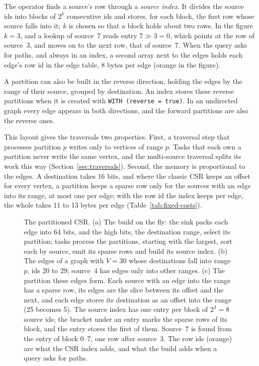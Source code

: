 The operator finds a source's row through a \emph{source index}. It divides the source ids into
blocks of $2^k$ consecutive ids and stores, for each block, the first row whose source falls into it; $k$ is chosen
so that a block holds about two rows. In the figure $k = 3$, and a lookup of source~7 reads entry $7 \gg 3 = 0$, which
points at the row of source~3, and moves on to the next row, that of source~7. When the query asks for paths, and
always in an index, a second array next to the edges holds each edge's row id in the edge table, 8 bytes per edge
(orange in the figure).

A partition can also be built in the reverse direction, holding the edges by the range of their source, grouped by
destination. An index stores these reverse partitions when it is created with \texttt{WITH (reverse = true)}. In an
undirected graph every edge appears in both directions, and the forward partitions are also the reverse ones.

This layout gives the traversals two properties. First, a traversal step that processes partition $p$ writes only to
vertices of range $p$. Tasks that each own a partition never write the same vertex, and the multi-source
traversal splits its work this way (Section~\ref{sec:traversals}). Second, the memory is proportional to the edges. A destination takes 16 bits, and where the classic CSR keeps an offset for every vertex, a partition keeps
a sparse row only for the sources with an edge into its range, at most one per edge; with the row id the index keeps per edge, the whole takes 11 to 13 bytes per edge (Table~\ref{tab:fixed-costs}).

\begin{figure}[t]
  \centering
  
  \caption{The partitioned CSR. (a) The build on the fly: the sink packs each edge into 64 bits, and the high
  bits, the destination range, select its partition; tasks process the partitions, starting with the largest, sort
  each by source, emit its sparse rows and build its source index. (b) The edges of a graph with $V = 30$ whose destinations fall into range $p$, ids 20 to
  29; source~4 has edges only into other ranges. (c) The partition these edges form. Each source with an edge into the
  range has a sparse row, its edges are the slice between its offset and the next, and each edge stores its
  destination as an offset into the range (25 becomes 5). The source index has one entry per block of $2^3 = 8$
  source ids; the bracket under an entry marks the sparse rows of its block, and the entry stores the first of them.
  Source~7 is found from the entry of block 0--7, one row after source~3. The row ids (orange) are what the CSR index adds, and what the build adds when a query asks for
  paths.}
  \label{fig:partitioned-csr}
\end{figure}


